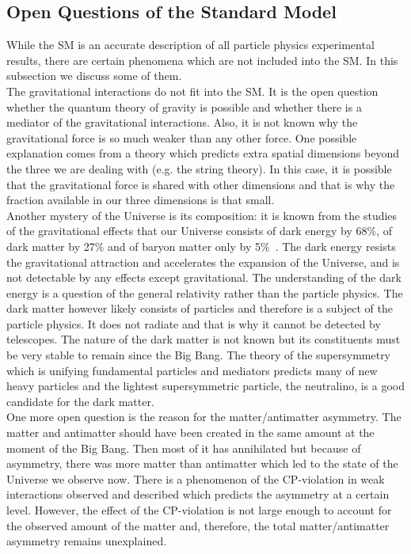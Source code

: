 \subsection{Open Questions of the Standard Model}


While the SM is an accurate description of all particle physics experimental results, there are certain phenomena which are not included into the SM. In this subsection we discuss some of them.\\

The gravitational interactions do not fit into the SM. It is the open question whether the quantum theory of gravity is possible and whether there is a mediator of the gravitational interactions. Also, it is not known why the gravitational force is so much weaker than any other force. One possible explanation comes from a theory which predicts extra spatial dimensions beyond the three we are dealing with (e.g. the string theory). In this case, it is possible that the gravitational force is shared with other dimensions and that is why the fraction available in our three dimensions is that small.\\

Another mystery of the Universe is its composition: it is known from the studies of the gravitational effects that our Universe consists of dark energy by 68\%, of dark matter by 27\% and of baryon matter only by 5\%~\cite{ref_NASA}. The dark energy resists the gravitational attraction and accelerates the expansion of the Universe, and is not detectable by any effects except gravitational. The understanding of the dark energy is a question of the general relativity rather than the particle physics. The dark matter however likely consists of particles and therefore is a subject of the particle physics. It does not radiate and that is why it cannot be detected by telescopes. The nature of the dark matter is not known but its constituents must be very stable to remain since the Big Bang. The theory of the supersymmetry which is unifying fundamental particles and mediators predicts many of new heavy particles and the lightest supersymmetric particle, the neutralino, is a good candidate for the dark matter.\\

One more open question is the reason for the matter/antimatter asymmetry. The matter and antimatter should have been created in the same amount at the moment of the Big Bang. Then most of it has annihilated but because of asymmetry, there was more matter than antimatter which led to the state of the Universe we observe now. There is a phenomenon of the CP-violation in weak interactions observed and described which predicts the asymmetry at a certain level. However, the effect of the CP-violation is not large enough to account for the observed amount of the matter and, therefore, the total matter/antimatter asymmetry remains unexplained. \\

